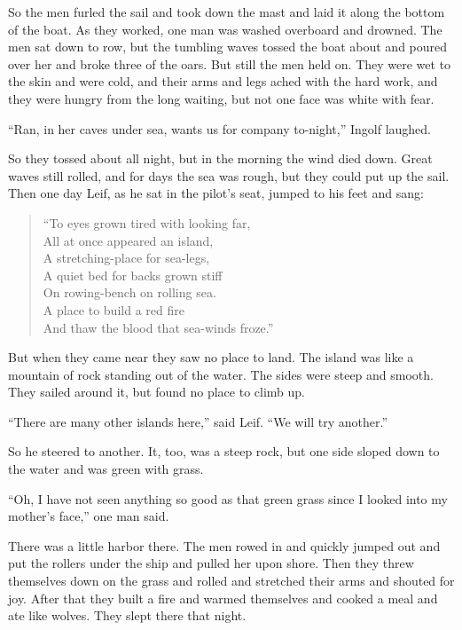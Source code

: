 So the men furled the sail and took down the mast and laid it along the
bottom of the boat. As they worked, one man was washed overboard and
drowned. The men sat down to row, but the tumbling waves tossed the boat
about and poured over her and broke three of the oars. But still the men
held on. They were wet to the skin and were cold, and their arms and
legs ached with the hard work, and they were hungry from the long
waiting, but not one face was white with fear.

``Ran, in her caves under sea, wants us for company to-night,'' Ingolf
laughed.

So they tossed about all night, but in the morning the wind died down.
Great waves still rolled, and for days the sea was rough, but they could
put up the sail. Then one day Leif, as he sat in the pilot's seat,
jumped to his feet and sang:

\begin{quote}
``To eyes grown tired with looking far,\\
All at once appeared an island,\\
A stretching-place for sea-legs,\\
A quiet bed for backs grown stiff\\
On rowing-bench on rolling sea.\\
A place to build a red fire\\
And thaw the blood that sea-winds froze.''
\end{quote}

But when they came near they saw no place to land. The island was like a
mountain of rock standing out of the water. The sides were steep and
smooth. They sailed around it, but found no place to climb up.

``There are many other islands here,'' said Leif. ``We will try
another.''

So he steered to another. It, too, was a steep rock, but one side sloped
down to the water and was green with grass.

``Oh, I have not seen anything so good as that green grass since I
looked into my mother's face,'' one man said.

There was a little harbor there. The men rowed in and quickly jumped out
and put the rollers under the ship and pulled her upon shore. Then they
threw themselves down on the grass and rolled and stretched their arms
and shouted for joy. After that they built a fire and warmed themselves
and cooked a meal and ate like wolves. They slept there that night.

